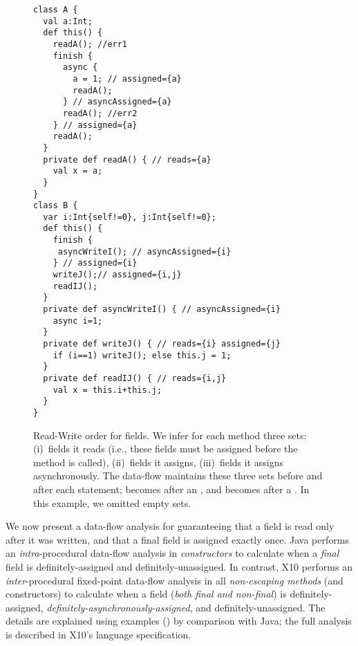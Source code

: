 \begin{figure}
\vspace{-0.2cm}\begin{lstlisting}
class A {
  val a:Int;
  def this() {
    readA(); //err1
    finish {
      async {
        a = 1; // assigned={a}
        readA();
      } // asyncAssigned={a}
      readA(); //err2
    } // assigned={a}
    readA();
  }
  private def readA() { // reads={a}
    val x = a;
  }
}
class B {
  var i:Int{self!=0}, j:Int{self!=0};
  def this() {
    finish {
     asyncWriteI(); // asyncAssigned={i}
    } // assigned={i}
    writeJ();// assigned={i,j}
    readIJ();
  }
  private def asyncWriteI() { // asyncAssigned={i}
    async i=1;
  }
  private def writeJ() { // reads={i} assigned={j}
    if (i==1) writeJ(); else this.j = 1;
  }
  private def readIJ() { // reads={i,j}
    val x = this.i+this.j;
  }
}
\end{lstlisting}\vspace{-0.2cm}
\caption{Read-Write order for fields.
    We infer for each method three sets:
        (i)~fields it reads (i.e., these fields must be assigned before the method is called),
        (ii)~fields it assigns,
        (iii)~fields it assigns asynchronously.
    The data-flow maintains these three sets before and after each statement;
         becomes  after an ,
        and  becomes  after a .
    In this example, we omitted empty sets.
    }
\label{Figure:Read-Write-Order}
\end{figure}

We now present a data-flow analysis for guaranteeing
    that a field is read only after it was written,
    and that a final field is assigned exactly once.
Java performs an \emph{intra}-procedural data-flow analysis in \emph{constructors} to calculate
    when a \emph{final} field is definitely-assigned and definitely-unassigned.
In contrast, X10 performs an \emph{inter}-procedural fixed-point data-flow analysis
    in all \emph{non-escaping methods} (and constructors) to calculate
    when {a} field (\emph{both final and non-final}) is
    definitely-assigned, \emph{definitely-asynchronously-assigned}, and definitely-unassigned.
The details are explained using examples () by comparison with Java;
    the full analysis is described in X10's language specification.

